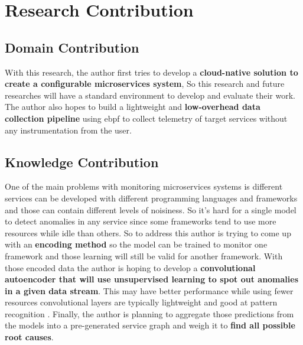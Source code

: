
{\let\clearpage\relax\chapter{Research Contribution}}


\section{Domain Contribution}

With this research, the author first tries to develop a \textbf{cloud-native solution to create a configurable microservices system}, So this research and future researches will have a standard environment to develop and evaluate their work. The author also hopes to build a lightweight and \textbf{low-overhead data collection pipeline} using \ac{ebpf} to collect telemetry of target services without any instrumentation from the user.

\section{Knowledge Contribution}

One of the main problems with monitoring microservices systems is different services can be developed with different programming languages and frameworks and those can contain different levels of noisiness\label{need-for-encoding}. So it's hard for a single model to detect anomalies in any service since some frameworks tend to use more resources while idle than others.  So to address this author is trying to come up with an \textbf{encoding method} so the model can be trained to monitor one framework and those learning will still be valid for another framework. With those encoded data the author is hoping to develop a \textbf{convolutional autoencoder that will use unsupervised learning to spot out anomalies in a given data stream}. This may have better performance while using fewer resources convolutional layers are typically lightweight and good at pattern recognition \citep{oord2016wavenet}. Finally, the author is planning to aggregate those predictions from the models into a pre-generated service graph and weigh it to \textbf{find all possible root causes}.
